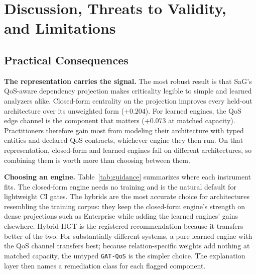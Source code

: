 \documentclass[preprint,3p]{elsarticle}
\begin{document}
\section{Discussion, Threats to Validity, and Limitations}
\label{sec:8}

\subsection{Practical Consequences}
\label{sec:8.1}

\noindent\textbf{The representation carries the signal.} The most robust result is that SaG's QoS-aware dependency projection makes criticality legible to simple and learned analyzers alike. Closed-form centrality on the projection improves every held-out architecture over its unweighted form ($+0.204$). For learned engines, the QoS edge channel is the component that matters ($+0.073$ at matched capacity). Practitioners therefore gain most from modeling their architecture with typed entities and declared QoS contracts, whichever engine they then run. On that representation, closed-form and learned engines fail on different architectures, so combining them is worth more than choosing between them.

\noindent\textbf{Choosing an engine.} Table~\ref{tab:guidance} summarizes where each instrument fits. The closed-form engine needs no training and is the natural default for lightweight CI gates. The hybrids are the most accurate choice for architectures resembling the training corpus: they keep the closed-form engine's strength on dense projections such as Enterprise while adding the learned engines' gains elsewhere. Hybrid-HGT is the registered recommendation because it transfers better of the two. For substantially different systems, a pure learned engine with the QoS channel transfers best; because relation-specific weights add nothing at matched capacity, the untyped \texttt{GAT-QoS} is the simpler choice. The explanation layer then names a remediation class for each flagged component.
\end{document}
